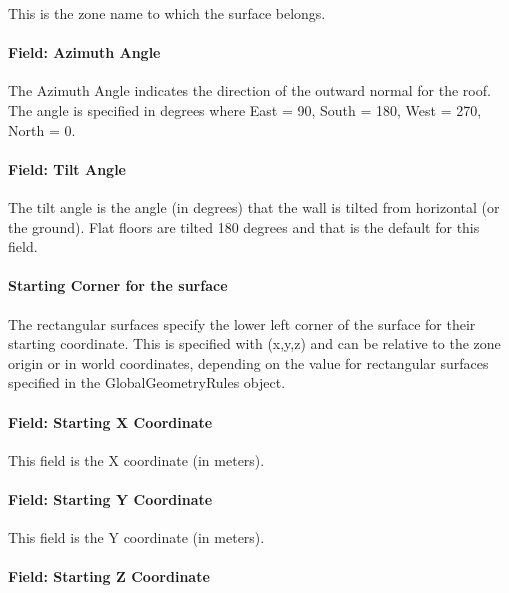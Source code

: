 This is the zone name to which the surface belongs.

\paragraph{Field: Azimuth Angle}\label{field-azimuth-angle-8}

The Azimuth Angle indicates the direction of the outward normal for the roof. The angle is specified in degrees where East = 90, South = 180, West = 270, North = 0.

\paragraph{Field: Tilt Angle}\label{field-tilt-angle-8}

The tilt angle is the angle (in degrees) that the wall is tilted from horizontal (or the ground). Flat floors are tilted 180 degrees and that is the default for this field.

\paragraph{Starting Corner for the surface}\label{starting-corner-for-the-surface-8}

The rectangular surfaces specify the lower left corner of the surface for their starting coordinate. This is specified with (x,y,z) and can be relative to the zone origin or in world coordinates, depending on the value for rectangular surfaces specified in the GlobalGeometryRules object.

\paragraph{Field: Starting X Coordinate}\label{field-starting-x-coordinate-8}

This field is the X coordinate (in meters).

\paragraph{Field: Starting Y Coordinate}\label{field-starting-y-coordinate-8}

This field is the Y coordinate (in meters).

\paragraph{Field: Starting Z Coordinate}\label{field-starting-z-coordinate-8}

